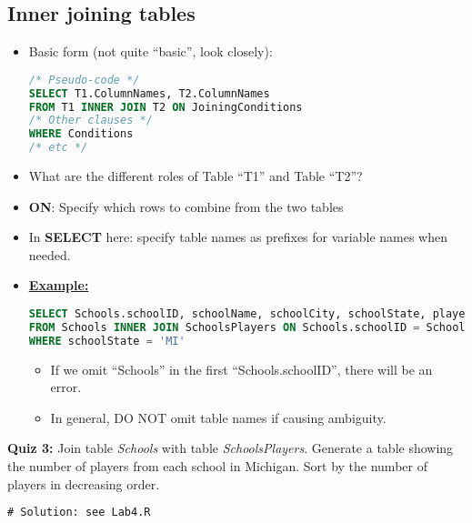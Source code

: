 \documentclass[12pt]{article}
\begin{document}
\subsection{Inner joining tables}
\begin{itemize}
	\item Basic form (not quite ``basic'', look closely):
\begin{lstlisting}[style=displaycode, language=SQL]
/* Pseudo-code */
SELECT T1.ColumnNames, T2.ColumnNames
FROM T1 INNER JOIN T2 ON JoiningConditions
/* Other clauses */
WHERE Conditions
/* etc */
\end{lstlisting}
	\item What are the different roles of Table ``T1'' and Table ``T2''?
	\item {\bf ON}: Specify which rows to combine from the two tables
	\item In {\bf SELECT} here: specify table names as prefixes for variable names when needed.
	\item \underline{\bf Example:} 
\begin{lstlisting}[style=displaycode, language=SQL]
SELECT Schools.schoolID, schoolName, schoolCity, schoolState, playerID 
FROM Schools INNER JOIN SchoolsPlayers ON Schools.schoolID = SchoolsPlayers.schoolID 
WHERE schoolState = 'MI'
\end{lstlisting}	
\begin{itemize}[label=*]
\item If we omit ``Schools'' in the first ``Schools.schoolID'', there will be an error.
\item In general, DO NOT omit table names if causing ambiguity.
\end{itemize}
\end{itemize}
{\bf Quiz 3:} Join table \emph{Schools} with table \emph{SchoolsPlayers}. Generate a table showing the number of players from each school in Michigan. Sort by the number of players in decreasing order.

\begin{lstlisting}[style=displaycode, language=SQL]
# Solution: see Lab4.R
\end{lstlisting}
\end{document}
